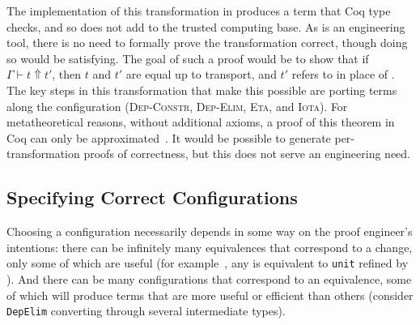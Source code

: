 The implementation of this transformation in \toolname produces a term that Coq type checks, and so does not
add to the trusted computing base.
As \toolname is an engineering tool, there is no need to formally prove the transformation correct, though doing so would be satisfying.
The goal of such a proof would be to show that %
if $\Gamma \vdash t \Uparrow t'$,
then $t$ and $t'$ are equal up to transport, and $t'$ refers to \B in place of \A.
The key steps in this transformation that make this possible are porting terms along the configuration %
(\textsc{Dep-Constr}, \textsc{Dep-Elim}, \textsc{Eta}, and \textsc{Iota}).
For metatheoretical reasons, without additional axioms, a proof of this theorem in Coq can only be approximated~\cite{tabareau2017equivalences}.
It would be possible to generate per-transformation proofs of correctness, but this does not serve an engineering need.

\subsection{Specifying Correct Configurations}
\label{sec:art}


Choosing a configuration necessarily depends in some way on the proof engineer's intentions:
there can be infinitely many equivalences that correspond to a 
change, only some of which are useful (for example~\href{https://github.com/uwplse/pumpkin-pi/blob/v2.0.0/plugin/coq/playground/refine_unit.v}{}, any \A is equivalent to \lstinline{unit} refined by \A). %
And there can be many configurations that correspond
to an equivalence, some of which will produce terms that are more useful or efficient than others
(consider \lstinline{DepElim} converting through several intermediate types).

